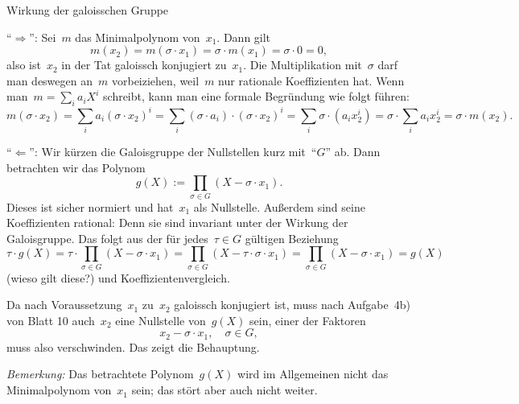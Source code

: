 \documentclass{algblatt}
\begin{document}
\begin{aufgabe}{Wirkung der galoisschen Gruppe}
\begin{loesungE}
\item "`$\Longrightarrow$"': Sei~$m$ das Minimalpolynom von~$x_1$. Dann gilt
\[ m(x_2) = m(\sigma \cdot x_1) = \sigma \cdot m(x_1) = \sigma \cdot 0 = 0, \]
also ist~$x_2$ in der Tat galoissch konjugiert zu~$x_1$.
Die Multiplikation mit~$\sigma$ darf man deswegen an~$m$ vorbeiziehen, weil~$m$
nur rationale Koeffizienten hat. Wenn man~$m = \sum_i a_i X^i$ schreibt, kann
man eine formale Begründung wie folgt führen:
\[ m(\sigma \cdot x_2) =
  \sum_i a_i (\sigma \cdot x_2)^i =
  \sum_i (\sigma \cdot a_i) \cdot (\sigma \cdot x_2)^i =
  \sum_i \sigma \cdot (a_i x_2^i) =
  \sigma \cdot \sum_i a_i x_2^i =
  \sigma \cdot m(x_2). \]

"`$\Longleftarrow$"': Wir kürzen die Galoisgruppe der Nullstellen kurz
mit~"`$G$"' ab. Dann betrachten wir das Polynom
\[ g(X) := \prod_{\sigma \in G} (X - \sigma \cdot x_1). \]
Dieses ist sicher normiert und hat~$x_1$ als Nullstelle. Außerdem sind seine
Koeffizienten rational: Denn sie sind invariant unter der Wirkung der
Galoisgruppe. Das folgt aus der für jedes~$\tau \in G$ gültigen Beziehung
\[ \tau \cdot g(X) = \tau \cdot \prod_{\sigma \in G} (X
- \sigma \cdot x_1) = \prod_{\sigma \in G} (X - \tau \cdot
  \sigma \cdot x_1) = \prod_{\sigma \in G} (X
  - \sigma \cdot x_1) = g(X) \]
(wieso gilt diese?) und Koeffizientenvergleich.

Da nach Voraussetzung~$x_1$ zu~$x_2$ galoissch konjugiert ist, muss nach
Aufgabe~4b) von Blatt 10 auch~$x_2$ eine Nullstelle von~$g(X)$ sein, einer der
Faktoren
\[ x_2 - \sigma \cdot x_1, \quad \sigma \in G, \]
muss also verschwinden. Das zeigt die Behauptung.

\emph{Bemerkung:} Das betrachtete Polynom~$g(X)$ wird im Allgemeinen nicht das
Minimalpolynom von~$x_1$ sein; das stört aber auch nicht weiter.
\end{loesungE}
\end{aufgabe}
\end{document}
